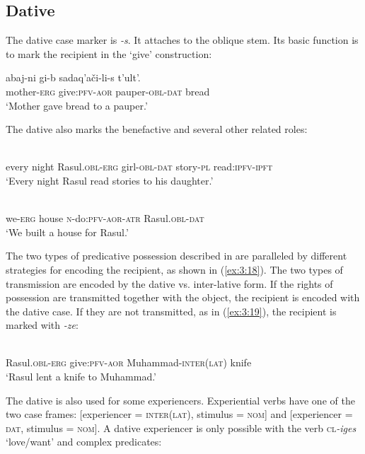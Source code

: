 ﻿\documentclass[output=paper]{langsci/langscibook}
\begin{document}
\subsection{Dative}\label{dative}

The dative case marker is \emph{-s}. It attaches to the oblique stem.
Its basic function is to mark the recipient in the `give' construction:

\ea
\gll  abaj-ni gi-b sadaq'ači-li-s t'ult'.\\
mother-\textsc{erg} give:\textsc{pfv}-\textsc{aor} pauper-\textsc{obl}-\textsc{dat} bread\\
\glt `Mother gave bread to a pauper.'
\z

The dative also marks the benefactive and several other related roles:

\ea
{}\\
every night Rasul.\textsc{obl}-\textsc{erg} girl-\textsc{obl}-\textsc{dat} story-\textsc{pl} read:\textsc{ipfv}-\textsc{ipft}\\
\glt `Every night Rasul read stories to his daughter.'

\ex \label{ex:3:18}
\\
we-\textsc{erg} house \textsc{n}-do:\textsc{pfv}-\textsc{aor}-\textsc{atr} Rasul.\textsc{obl}-\textsc{dat}\\
\glt `We built a house for Rasul.'
\z

The two types of predicative possession described in  are
paralleled by different strategies for encoding the recipient, as shown
in (\ref{ex:3:18}). The two types of transmission are encoded by the dative vs.
inter-lative form. If the rights of possession are transmitted together
with the object, the recipient is encoded with the dative case. If they
are not transmitted, as in (\ref{ex:3:19}), the recipient is marked with
\emph{-ze}:

\ea \label{ex:3:19}
\\
Rasul.\textsc{obl}-\textsc{erg} give:\textsc{pfv}-\textsc{aor} Muhammad-\textsc{inter}(\textsc{lat}) knife\\
\glt `Rasul lent a knife to Muhammad.'
\z

The dative is also used for some experiencers. Experiential verbs have
one of the two case frames: [experiencer = \textsc{inter(lat)}, stimulus =
\textsc{nom}] and [experiencer = \textsc{dat}, stimulus = \textsc{nom}]. A dative
experiencer is only possible with the verb
\textsc{cl}\emph{-iges} `love/want' and complex predicates:
\end{document}
